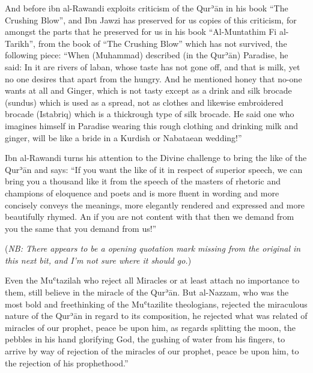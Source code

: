 \documentclass[12pt]{memoir}
\def\´{ʾ} %
\def\`{ʿ} %
\def \Quran{Qur\-\´ān} %
\let \Qrn=\Quran      %
\def\/{\discretionary{/}{}{/}}
\def\–{-\hskip0pt}
\newcommand{\NB}[1]{\emph{\small NB: #1}}
\begin{document}

And before ibn al\–Rawandi exploits criticism of the \Qrn{} in his book “The
Crushing Blow”, and Ibn Jawzi has preserved for us copies of this criticism,
for amongst the parts that he preserved for us in his book “Al\–Muntathim Fi
al\–Tarikh”, from the book of “The Crushing Blow” which has not survived, the
following piece: “When (Muhammad) described (in the \Quran) Paradise, he said:
In it are rivers of laban, whose taste has not gone off, and that is milk, yet
no one desires that apart from the hungry. And he mentioned honey that no-one
wants at all and Ginger, which is not tasty except as a drink and silk brocade
(sundus) which is used as a spread, not as clothes and likewise embroidered
brocade (Istabriq) which is a thick\/rough type of silk brocade.
He said one who
imagines himself in Paradise wearing this rough clothing and drinking milk and
ginger, will be like a bride in a Kurdish or Nabataean wedding!”\footnotemark


Ibn al\–Rawandi turns his attention to the Divine challenge to bring the like of
the \Qrn{} and says: “If you want the like of it in respect of superior speech,
we can bring you a thousand like it from the speech of the masters of rhetoric
and champions of eloquence and poets and is more fluent in wording and more
concisely conveys the meanings, more elegantly rendered and expressed and more
beautifully rhymed. An if you are not content with that then we demand from you
the same that you demand from us!”\footnotemark


(\NB{There appears to be a opening quotation mark missing from the original in
this next bit, and I’m not sure where it should go.})

Even the Mu\`tazilah who reject all Miracles or at least attach no importance to
them, still believe in the miracle of the \Quran.\footnotemark\@
{}
But al\–Nazzam, who was the most bold and freethinking of the Mu\`tazilite
theologians, rejected the miraculous nature of the \Qrn{} in regard to its
composition, he rejected what was related of miracles of our prophet, peace be
upon him, as regards splitting the moon, the pebbles in his hand glorifying
God, the gushing of water from his fingers, to arrive by way of rejection of
the miracles of our prophet, peace be upon him, to the rejection of his
prophethood.”\footnotemark
\end{document}
